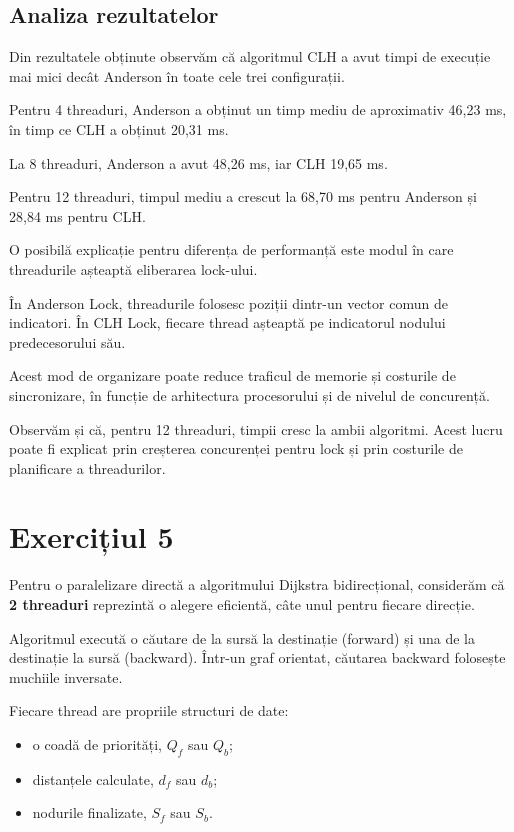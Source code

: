 \documentclass[12pt,a4paper]{article}
\begin{document}
\subsection*{Analiza rezultatelor}

Din rezultatele obținute observăm că
algoritmul CLH a avut timpi de execuție
mai mici decât Anderson în toate cele
trei configurații.

Pentru 4 threaduri, Anderson a obținut
un timp mediu de aproximativ 46,23 ms,
în timp ce CLH a obținut 20,31 ms.

La 8 threaduri, Anderson a avut
48,26 ms, iar CLH 19,65 ms.

Pentru 12 threaduri, timpul mediu
a crescut la 68,70 ms pentru Anderson
și 28,84 ms pentru CLH.

O posibilă explicație pentru diferența
de performanță este modul în care
threadurile așteaptă eliberarea lock-ului.

În Anderson Lock, threadurile folosesc
poziții dintr-un vector comun de indicatori.
În CLH Lock, fiecare thread așteaptă
pe indicatorul nodului predecesorului său.

Acest mod de organizare poate reduce
traficul de memorie și costurile de
sincronizare, în funcție de arhitectura
procesorului și de nivelul de concurență.

Observăm și că, pentru 12 threaduri,
timpii cresc la ambii algoritmi.
Acest lucru poate fi explicat prin
creșterea concurenței pentru lock
și prin costurile de planificare
a threadurilor.


\newpage
\section*{Exercițiul 5}

Pentru o paralelizare directă a algoritmului
Dijkstra bidirecțional, considerăm că
\textbf{2 threaduri} reprezintă o alegere
eficientă, câte unul pentru fiecare direcție.

Algoritmul execută o căutare de la sursă
la destinație (forward) și una de la destinație
la sursă (backward). Într-un graf orientat,
căutarea backward folosește muchiile inversate.

Fiecare thread are propriile structuri de date:
\begin{itemize}
    \item o coadă de priorități, $Q_f$ sau $Q_b$;
    \item distanțele calculate, $d_f$ sau $d_b$;
    \item nodurile finalizate, $S_f$ sau $S_b$.
\end{itemize}
\end{document}
